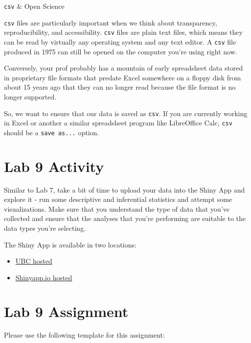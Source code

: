 \documentclass[
]{book}
\providecommand{\tightlist}{%
  \setlength{\itemsep}{0pt}\setlength{\parskip}{0pt}}
\begin{document}
\texttt{csv} \& Open Science

\texttt{csv} files are particularly important when we think about transparency, reproducibility, and accessibility. \texttt{csv} files are plain text files, which means they can be read by virtually any operating system and any text editor. A \texttt{csv} file produced in 1975 can still be opened on the computer you're using right now.

Conversely, your prof probably has a mountain of early spreadsheet data stored in proprietary file formats that predate Excel somewhere on a floppy disk from about 15 years ago that they can no longer read because the file format is no longer supported.

So, we want to ensure that our data is saved as \texttt{csv}. If you are currently working in Excel or another a similar spreadsheet program like LibreOffice Calc, \texttt{csv} should be a \texttt{save\ as...} option.

\hypertarget{lab-9-activity}{%
\chapter*{Lab 9 Activity}\label{lab-9-activity}}

Similar to Lab 7, take a bit of time to upload your data into the Shiny App and explore it - run some descriptive and inferential statistics and attempt some visualizations. Make sure that you understand the type of data that you've collected and ensure that the analyses that you're performing are suitable to the data types you're selecting.

The Shiny App is available in two locations:

\begin{itemize}
\tightlist
\item
  \href{https://openscience.ok.ubc.ca/shiny/BIOL-116/}{UBC hosted}
\item
  \href{https://ubco-biology.shinyapps.io/biol-116/}{Shinyapp.io hosted}
\end{itemize}

\hypertarget{lab-9-assignment}{%
\chapter*{Lab 9 Assignment}\label{lab-9-assignment}}

Please use the following template for this assignment:
\end{document}
